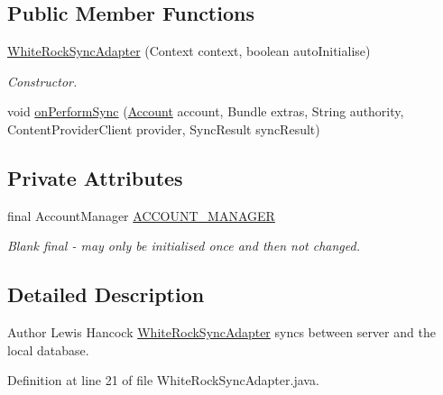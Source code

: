 \subsection*{Public Member Functions}
\begin{DoxyCompactItemize}
\item 
\hyperlink{classuk_1_1ac_1_1swan_1_1digitaltrails_1_1sync_1_1_white_rock_sync_adapter_aa7e57764badc281ac92c6cc436b7975c}{White\+Rock\+Sync\+Adapter} (Context context, boolean auto\+Initialise)
\begin{DoxyCompactList}\small\item\em Constructor. \end{DoxyCompactList}\item 
void \hyperlink{classuk_1_1ac_1_1swan_1_1digitaltrails_1_1sync_1_1_white_rock_sync_adapter_a36b050046661ce4a83d34f1ccfb353e4}{on\+Perform\+Sync} (\hyperlink{classuk_1_1ac_1_1swan_1_1digitaltrails_1_1components_1_1_account}{Account} account, Bundle extras, String authority, Content\+Provider\+Client provider, Sync\+Result sync\+Result)
\end{DoxyCompactItemize}
\subsection*{Private Attributes}
\begin{DoxyCompactItemize}
\item 
final Account\+Manager \hyperlink{classuk_1_1ac_1_1swan_1_1digitaltrails_1_1sync_1_1_white_rock_sync_adapter_a77f81d8a5abf1624a631002b7cc8a156}{A\+C\+C\+O\+U\+N\+T\+\_\+\+M\+A\+N\+A\+G\+E\+R}
\begin{DoxyCompactList}\small\item\em Blank final -\/ may only be initialised once and then not changed. \end{DoxyCompactList}\end{DoxyCompactItemize}


\subsection{Detailed Description}
\begin{DoxyAuthor}{Author}
Lewis Hancock \hyperlink{classuk_1_1ac_1_1swan_1_1digitaltrails_1_1sync_1_1_white_rock_sync_adapter}{White\+Rock\+Sync\+Adapter} syncs between server and the local database. 
\end{DoxyAuthor}


Definition at line 21 of file White\+Rock\+Sync\+Adapter.\+java.



